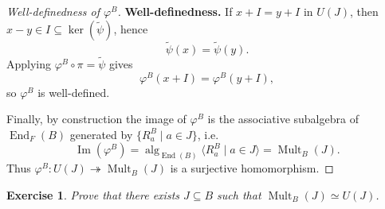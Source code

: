 \documentclass{article}
\newtheorem{exercise}[theorem]{Exercise}
\begin{document}
\begin{proof}[Well-definedness of $\varphi^B$]
\noindent\textbf{Well-definedness.}
If $x+I=y+I$ in $U(J)$, then $x-y\in I\subseteq \ker(\widetilde{\psi})$, hence
\[
\widetilde{\psi}(x)=\widetilde{\psi}(y).
\]
Applying $\varphi^B\circ\pi=\widetilde{\psi}$ gives
\[
\varphi^B(x+I)=\varphi^B(y+I),
\]
so $\varphi^B$ is well-defined.

Finally, by construction the image of $\varphi^B$ is the associative subalgebra of $\operatorname{End}_F(B)$
generated by $\{R_a^B\mid a\in J\}$, i.e.
\[
\operatorname{Im}(\varphi^B)=\operatorname{alg}_{\operatorname{End}(B)}\langle R_a^B\mid a\in J\rangle
=\operatorname{Mult}_B(J).
\]
Thus $\varphi^B:U(J)\twoheadrightarrow \operatorname{Mult}_B(J)$ is a surjective homomorphism.
\end{proof}

\begin{exercise}
Prove that there exists $ J \subseteq B $ such that $ \operatorname{Mult}_B(J) \simeq U(J) $.  
\end{exercise}
\end{document}
